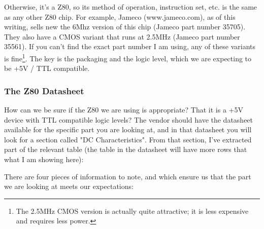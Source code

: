 \documentclass[10pt]{report}
\begin{document}
Otherwise, it's a Z80, so its method of operation, instruction set, etc. is the same as any other Z80 chip. For example, Jameco (www.jameco.com), as of this writing, sells new the 6Mhz version of this chip (Jameco part number 35705). They also have a CMOS variant that runs at 2.5MHz (Jameco part number 35561). If you can't find the exact part number I am using, any of these variants is fine\footnote{The 2.5MHz CMOS version is actually quite attractive; it is less expensive and requires less power.}. The key is the packaging and the logic level, which we are expecting to be +5V / TTL compatible. 

\subsubsection{The Z80 Datasheet}

How can we be sure if the Z80 we are using is appropriate? That it is a +5V device with TTL compatible logic levels? The vendor should have the datasheet available for the specific part you are looking at, and in that datasheet you will look for a section called "DC Characteristics". From that section, I've extracted part of the relevant table (the table in the datasheet will have more rows that what I am showing here):



There are four pieces of information to note, and which ensure us that the part we are looking at meets our expectations:
\end{document}

